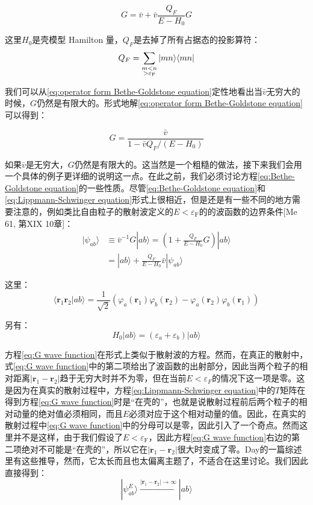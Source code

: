 \begin{equation}
G=\bar{v}+\bar{v}\frac{Q_{F}}{E-H_{0}}G\label{eq:operator form Bethe-Goldstone equation}
\end{equation}

这里$H_{0}$是壳模型 Hamilton 量，$Q_{F}$是去掉了所有占据态的投影算符：
\begin{equation}
Q_{F}=\sum_{\begin{subarray}{c}
m<n\\
>\varepsilon_{\text{F}}
\end{subarray}}|mn\rangle\langle mn|\label{eq:project operator}
\end{equation}

我们可以从\ref{eq:operator form Bethe-Goldstone equation}定性地看出当$\bar{v}$无穷大的时候，$G$仍然是有限大的。形式地解\ref{eq:operator form Bethe-Goldstone equation}可以得到：

\[
G=\frac{\bar{v}}{1-\bar{v}Q_{F}/(E-H_{0})}
\]

如果$\bar{v}$是无穷大，$G$仍然是有限大的。这当然是一个粗糙的做法，接下来我们会用一个具体的例子更详细的说明这一点。在此之前，我们必须讨论方程\ref{eq:Bethe-Goldstone equation}的一些性质。尽管\ref{eq:Bethe-Goldstone equation}和\ref{eq:Lippmann-Schwinger equation}形式上很相近，但是还是有一些不同的地方需要注意的，例如类比自由粒子的散射波定义的$E<\varepsilon_{\text{F}}$的的波函数的边界条件{[}Me
61, 第XIX 10章{]}：
\begin{align}
|\psi_{ab}\rangle & \equiv\bar{v}^{-1}G|ab\rangle=\left(1+\frac{Q_{F}}{E-H_{0}}G\right)|ab\rangle\label{eq:G wave function}\\
 & =|ab\rangle+\frac{Q_{F}}{E-H_{0}}\bar{v}|\psi_{ab}\rangle\nonumber 
\end{align}

这里：
\[
\langle\boldsymbol{r}_{1}\boldsymbol{r}_{2}|ab\rangle=\frac{1}{\sqrt{2}}(\varphi_{a}(\boldsymbol{r}_{1})\varphi_{b}(\boldsymbol{r}_{2})-\varphi_{a}(\boldsymbol{r}_{2})\varphi_{b}(\boldsymbol{r}_{1}))
\]

另有：
\[
H_{0}|ab\rangle=(\varepsilon_{a}+\varepsilon_{b})|ab\rangle
\]

方程\ref{eq:G wave function}在形式上类似于散射波的方程。然而，在真正的散射中，式\ref{eq:G wave function}中的第二项给出了波函数的出射部分，因此当两个粒子的相对距离$\left|\boldsymbol{r}_{1}-\boldsymbol{r}_{2}\right|$趋于无穷大时并不为零，但在当前$E<\varepsilon_{F}$的情况下这一项是零。这是因为在真实的散射过程中，方程\ref{eq:Lippmann-Schwinger equation}中的$T$矩阵在得到方程\ref{eq:G wave function}时是“在壳的”，也就是说散射过程前后两个粒子的相对动量的绝对值必须相同，而且$E$必须对应于这个相对动量的值。因此，在真实的散射过程中\ref{eq:G wave function}中的分母可以是零，因此引入了一个奇点。然而这里并不是这样，由于我们假设了$E<\varepsilon_{\text{F}}$，因此方程\ref{eq:G wave function}右边的第二项绝对不可能是“在壳的”，所以它在$\left|\boldsymbol{r}_{1}-\boldsymbol{r}_{2}\right|$很大时变成了零。Day\cite{Da67}的一篇综述里有这些推导，然而，它太长而且也太偏离主题了，不适合在这里讨论。我们因此直接得到：
\[
|\psi^{E}_{ab}\rangle\xrightarrow{\left|\boldsymbol{r}_{1}-\boldsymbol{r}_{2}\right|\rightarrow\infty}|ab\rangle
\]

